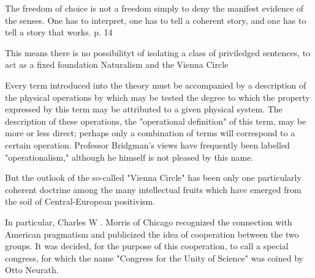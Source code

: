 




The freedom of choice is not a freedom simply to deny the manifest evidence of the senses. One has to interpret, one has to tell a coherent story, and one has to tell a story that works. p. 14


This means there is no possibilityt of isolating a class of priviledged sentences, to act as a fixed foundation Naturalism and the Vienna Circle

Every term  introduced into the theory must be accompanied by  a description of the physical operations by which may  be tested the degree to which the property expressed  by this term may be attributed to a given physical  system. The description of these operations, the  "operational definition" of this term, may be more or  less direct; perhaps only a combination of terms will  correspond to a certain operation. Professor Bridgman's views have frequently been labelled "operationalism," although he himself is not pleased by this name.

But the outlook of the so-called "Vienna Circle"  has been only one particularly coherent doctrine  among the many intellectual fruits which have  emerged from the soil of Central-European positivism.

In particular, Charles  W . Morris of Chicago recognized the connection  with American pragmatism and publicized the idea  of cooperation between the two groups. It was decided, for the purpose of this cooperation, to call a  special congress, for which the name "Congress for  the Unity of Science" was coined by Otto Neurath.

